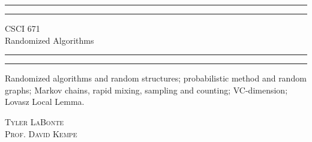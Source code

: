\begin{titlepage} %

	\centering %
	
	\scshape %
	
	
	\rule{\textwidth}{1.6pt}\vspace*{-\baselineskip}\vspace*{2pt} %
	\rule{\textwidth}{0.4pt} %
	
	\vspace{0.75\baselineskip} %
	
	{\LARGE CSCI 671\\} %
    {\LARGE Randomized Algorithms\\} %
	
	\vspace{0.75\baselineskip} %
	
	\rule{\textwidth}{0.4pt}\vspace*{-\baselineskip}\vspace{3.2pt} %
	\rule{\textwidth}{1.6pt} %
	
	\vspace{2\baselineskip} %
	
    
    Randomized algorithms and random structures; probabilistic method and random graphs; Markov chains, rapid mixing, sampling and counting; VC-dimension; Lovasz Local Lemma.
	
	\vspace*{2\baselineskip} %
	
	
	{\scshape\Large Tyler LaBonte \\ Prof. David Kempe \\} %
	
	\vspace{0.5\baselineskip} %
	

\end{titlepage}
